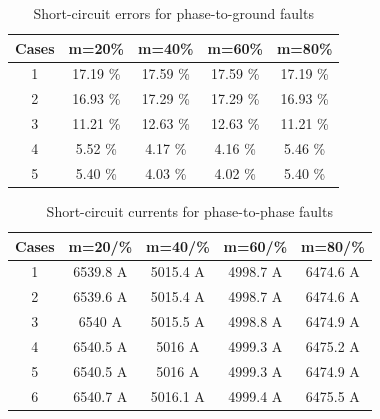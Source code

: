 \documentclass[conference]{IEEEtran}
\begin{document}
	\begin{table}[!hbt]
		\renewcommand{\arraystretch}{1.3}
		\caption{Short-circuit errors for phase-to-ground faults}
		\label{table:AT_CC_E}
		\centering
		\begin{tabular}{|c|c|c|c|c|}
			\hline
			\textbf{Cases} & \textbf{m=20\%} & \textbf{m=40\%} & \textbf{m=60\%} & \textbf{m=80\%} \\ \hline
			1              & 17.19 \%         & 17.59 \%         & 17.59 \%         & 17.19 \%         \\ \hline
			2              & 16.93 \%         & 17.29 \%         & 17.29 \%         & 16.93 \%         \\ \hline
			3              & 11.21 \%         & 12.63 \%         & 12.63 \%         & 11.21 \%         \\ \hline
			4              & 5.52 \%          & 4.17 \%          & 4.16 \%          & 5.46 \%          \\ \hline
			5              & 5.40 \%          & 4.03 \%          & 4.02 \%          & 5.40 \%          \\ \hline
		\end{tabular}
	\end{table}
	
	\begin{table}[!hbt]
		\renewcommand{\arraystretch}{1.3}
		\caption{Short-circuit currents for phase-to-phase faults}
		\label{table:AB_CC}
		\centering
		\begin{tabular}{|c|c|c|c|c|}
			\hline
			\textbf{Cases} & \textbf{m=20/\%} & \textbf{m=40/\%} & \textbf{m=60/\%} & \textbf{m=80/\%} \\ \hline
			1              & 6539.8 A         & 5015.4 A         & 4998.7 A         & 6474.6 A         \\ \hline
			2              & 6539.6 A         & 5015.4 A         & 4998.7 A         & 6474.6 A         \\ \hline
			3              & 6540 A           & 5015.5 A         & 4998.8 A         & 6474.9 A         \\ \hline
			4              & 6540.5 A         & 5016 A           & 4999.3 A         & 6475.2 A         \\ \hline
			5              & 6540.5 A         & 5016 A           & 4999.3 A         & 6474.9 A         \\ \hline
			6              & 6540.7 A         & 5016.1 A         & 4999.4 A         & 6475.5 A         \\ \hline
		\end{tabular}
	\end{table}
	
\end{document}
